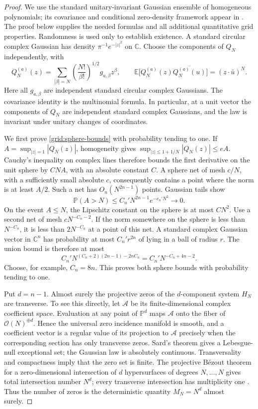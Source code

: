 \begin{proof}
We use the standard unitary-invariant Gaussian ensemble of homogeneous
polynomials; its covariance and conditional zero-density framework appear
in \citet[Sections~2.2 and~2.4]{BleherShiffmanZelditch2000}. The proof
below supplies the needed formulas and all additional quantitative grid
properties. Randomness is used only to establish existence. A
standard circular complex Gaussian has density
$\pi^{-1}e^{-|z|^2}$ on $\mathbb C$.  Choose the components of $Q_N$
independently, with
\[
 Q_N^{(a)}(z)=
 \sum_{|\beta|=N}\left(\frac{N!}{\beta!}\right)^{1/2}
       g_{a,\beta}z^\beta,
 \qquad
 \mathbb E\bigl[Q_N^{(a)}(z)
       \overline{Q_N^{(a)}(u)}\bigr]=(z\cdot\bar u)^N.
\]
Here all $g_{a,\beta}$ are independent standard circular complex
Gaussians.  The covariance identity is the multinomial formula.  In
particular, at a unit vector the components of $Q_N$ are independent
standard complex Gaussians, and the law is invariant under unitary
changes of coordinates.

We first prove \eqref{grid:sphere-bounds} with probability tending to
one.  If $A=\sup_{|z|=1}|Q_N(z)|$, homogeneity gives
$\sup_{|z|\le1+1/N}|Q_N(z)|\le eA$.  Cauchy's inequality on complex
lines therefore bounds the first derivative on the unit sphere by
$CNA$, with an absolute constant $C$.  A sphere net of mesh $c/N$,
with a sufficiently small absolute $c$, consequently contains a point
where the norm is at least $A/2$.  Such a net has
$O_n(N^{2n-1})$ points.  Gaussian tails show
\[
 \mathbb P(A>N)\le C_n' N^{2n-1}e^{-c_n' N^2}\longrightarrow0.
\]
On the event $A\le N$, the Lipschitz constant on the sphere is at
most $CN^2$.  Use a second net of mesh $cN^{-C_n-2}$.  If the norm
somewhere on the sphere is less than $N^{-C_n}$, it is less than
$2N^{-C_n}$ at a point of this net.  A standard complex Gaussian
vector in $\mathbb C^n$ has probability at most $C_n' r^{2n}$ of
lying in a ball of radius $r$.  The union bound is therefore at most
\[
 C_n' N^{(C_n+2)(2n-1)-2nC_n}
   =C_n' N^{-C_n+4n-2}.
\]
Choose, for example, $C_n=8n$.  This proves both sphere bounds with
probability tending to one.

Put $d=n-1$.  Almost surely the projective zeros of the $d$-component
system $H_N$ are transverse.  To see this directly, let $\mathcal A$
be its finite-dimensional complex coefficient space.  Evaluation at
any point of $\mathbb P^d$ maps $\mathcal A$ onto the fiber of
$\mathcal O(N)^{\oplus d}$.  Hence the universal zero incidence
manifold is smooth, and a coefficient vector is a regular value of its
projection to $\mathcal A$ precisely when the corresponding section
has only transverse zeros.  Sard's theorem gives a Lebesgue-null
exceptional set; the Gaussian law is absolutely continuous.
Transversality and compactness imply that the zero set is finite.
The projective B\'ezout theorem for a zero-dimensional intersection of
$d$ hypersurfaces of degrees $N,\ldots,N$ gives total intersection
number $N^d$; every transverse intersection has multiplicity one
\citep[Theorem~III-71]{EisenbudHarris2000GeometrySchemes}.  Thus the number of zeros is the deterministic
quantity $M_N=N^d$ almost surely.


\end{proof}
